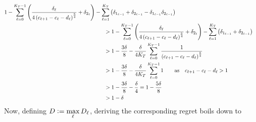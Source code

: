\documentclass{article} %
\newcommand{\dfq}{\vcentcolon=}
\begin{document}
\begin{align*}
     1-\sum\limits_{\ell=0}^{K_T-1} \left(\frac{\delta_\ell}{4\left(c_{\ell+1}- c_{\ell}-d_{\ell}\right)^\frac{5}{4}} + \delta_{2_\ell}\right) - \sum\limits_{\ell=1}^{K_T} \left( \delta_{1_{\ell-1}} +  \delta_{2_{\ell-1}} -  \delta_{1_{\ell-1}}\delta_{2_{\ell-1}}\right) \\ 
     & \hspace{-130pt} > 1-\sum\limits_{\ell=0}^{K_T-1} \left(\frac{\delta_\ell}{4\left(c_{\ell+1}- c_{\ell}-d_{\ell}\right)^\frac{5}{4}} + \delta_{2_\ell}\right) - \sum\limits_{\ell=1}^{K_T} \left( \delta_{1_{\ell-1}} +  \delta_{2_{\ell-1}} \right) \\
     & \hspace{-130pt} > 1 - \frac{3 \delta}{8}  -  \frac{\delta}{4 K_T} \sum\limits_{\ell=0}^{K_T-1} \frac{1}{\left(c_{\ell+1}- c_{\ell}-d_{\ell}\right)^\frac{5}{4}} \\
     & \hspace{-130pt} > 1 - \frac{3 \delta}{8}  -  \frac{\delta}{4 K_T} \sum\limits_{\ell=0}^{K_T-1} 1 \qquad \text{as} \quad c_{\ell+1}- c_{\ell}-d_{\ell} > 1 \\
     & \hspace{-130pt} > 1 - \frac{3 \delta}{8}  -  \frac{\delta}{4} = 1 - \frac{5 \delta}{8} \\
     & \hspace{-130pt} > 1 - \delta \\
\end{align*}
Now, defining $D \dfq \max\limits_\ell D_\ell$, deriving the corresponding regret boils down to 
\end{document}
